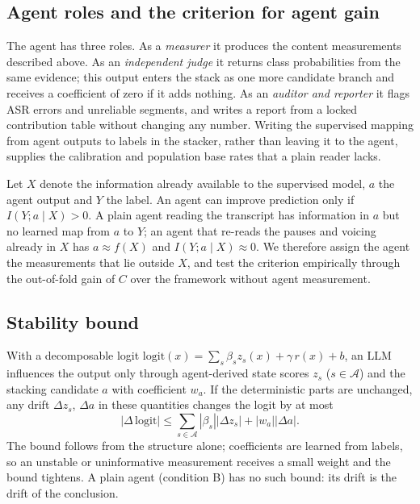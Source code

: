 \documentclass[pdflatex,sn-nature]{sn-jnl}
\begin{document}
\subsection{Agent roles and the criterion for agent gain}\label{sec:m-roles}

The agent has three roles. As a \emph{measurer} it produces the content measurements described above. As an \emph{independent judge} it returns class probabilities from the same evidence; this output enters the stack as one more candidate branch and receives a coefficient of zero if it adds nothing. As an \emph{auditor and reporter} it flags ASR errors and unreliable segments, and writes a report from a locked contribution table without changing any number. Writing the supervised mapping from agent outputs to labels in the stacker, rather than leaving it to the agent, supplies the calibration and population base rates that a plain reader lacks.

Let $X$ denote the information already available to the supervised model, $a$ the agent output and $Y$ the label. An agent can improve prediction only if $I(Y;a\mid X)>0$. A plain agent reading the transcript has information in $a$ but no learned map from $a$ to $Y$; an agent that re-reads the pauses and voicing already in $X$ has $a\approx f(X)$ and $I(Y;a\mid X)\approx 0$. We therefore assign the agent the measurements that lie outside $X$, and test the criterion empirically through the out-of-fold gain of $C$ over the framework without agent measurement.

\subsection{Stability bound}\label{sec:m-bound}

With a decomposable logit $\mathrm{logit}(x)=\sum_s\beta_s z_s(x)+\gamma\, r(x)+b$, an LLM influences the output only through agent-derived state scores $z_s$ ($s\in\mathcal A$) and the stacking candidate $a$ with coefficient $w_a$. If the deterministic parts are unchanged, any drift $\Delta z_s$, $\Delta a$ in these quantities changes the logit by at most
\begin{equation}
|\Delta\,\mathrm{logit}|\le \sum_{s\in\mathcal A}|\beta_s||\Delta z_s|+|w_a||\Delta a|.
\end{equation}
The bound follows from the structure alone; coefficients are learned from labels, so an unstable or uninformative measurement receives a small weight and the bound tightens. A plain agent (condition B) has no such bound: its drift is the drift of the conclusion.
\end{document}
